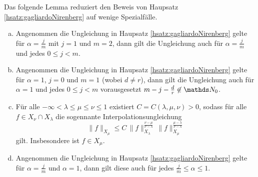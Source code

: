 Das folgende Lemma reduziert den Beweis von Haupsatz \ref{hsatz:gagliardoNirenberg} auf wenige Spezialfälle.

\begin{lem}
  \label{lem:reducingGagliardo}
  \begin{enumerate}[a)]
    \item Angenommen die Ungleichung in Haupsatz \ref{hsatz:gagliardoNirenberg} gelte für $\alpha = \frac{j}{m}$ mit $j = 1$ und $m = 2$, dann gilt die Ungleichung auch für $\alpha = \frac{j}{m}$ und jedes $0 \leq j < m$.

    \item Angenommen die Ungleichung in Haupsatz \ref{hsatz:gagliardoNirenberg} gelte für $\alpha = 1$, $j = 0$ und $m = 1$ (wobei $d \neq r$), dann gilt die Ungleichung auch für $\alpha = 1$ und jedes $0 \leq j < m$ vorausgesetzt $m - j - \frac{d}{r} \not\in \N_0$.
      
    \item Für alle $-\infty < \lambda \leq \mu \leq \nu \leq 1$ existiert $C = C(\lambda, \mu, \nu) > 0$, sodass für alle $f \in X_\nu \cap X_\lambda$ die sogennante Interpolationsungleichung
      $$
      \| f\|_{X_\mu} \leq C \, \|f\|_{X_\lambda}^{\frac{\nu - \mu}{\nu - \lambda}} \, \|f\|_{X_\mu}^{\frac{\mu - \lambda}{\nu - \lambda}}
      $$
      gilt.
      Insbesondere ist $f \in X_\mu$.

    \item Angenommen die Ungleichung in Haupsatz \ref{hsatz:gagliardoNirenberg} gelte für $\alpha = \frac{j}{m}$ und $\alpha = 1$, dann gilt diese auch für jedes $\frac{j}{m} \leq \alpha \leq 1$.
  \end{enumerate}
\end{lem}

